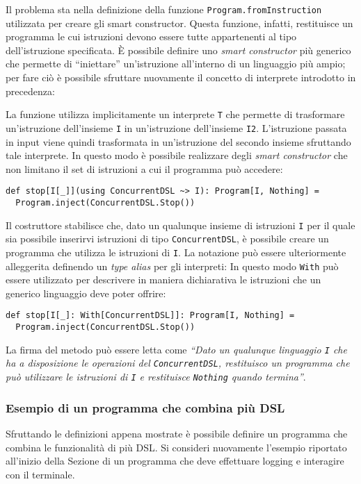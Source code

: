 Il problema sta nella definizione della funzione \lstinline{Program.fromInstruction} utilizzata per creare gli smart constructor. Questa funzione, infatti, restituisce un programma le cui istruzioni devono essere tutte appartenenti al tipo dell'istruzione specificata. È possibile definire uno \emph{smart constructor} più generico che permette di ``iniettare'' un'istruzione all'interno di un linguaggio più ampio; per fare ciò è possibile sfruttare nuovamente il concetto di interprete introdotto in precedenza:

La funzione utilizza implicitamente un interprete \lstinline{T} che permette di trasformare un'istruzione dell'insieme \lstinline{I} in un'istruzione dell'insieme \lstinline{I2}. L'istruzione passata in input viene quindi trasformata in un'istruzione del secondo insieme sfruttando tale interprete.
In questo modo è possibile realizzare degli \emph{smart constructor} che non limitano il set di istruzioni a cui il programma può accedere:
\begin{lstlisting}[language=scala3]
def stop[I[_]](using ConcurrentDSL ~> I): Program[I, Nothing] =
  Program.inject(ConcurrentDSL.Stop())
\end{lstlisting}
Il costruttore stabilisce che, dato un qualunque insieme di istruzioni \lstinline{I} per il quale sia possibile inserirvi istruzioni di tipo \lstinline{ConcurrentDSL}, è possibile creare un programma che utilizza le istruzioni di \lstinline{I}.
La notazione può essere ulteriormente alleggerita definendo un \emph{type alias} per gli interpreti:
In questo modo \lstinline{With} può essere utilizzato per descrivere in maniera dichiarativa le istruzioni che un generico linguaggio deve poter offrire:
\begin{lstlisting}[language=scala3]
def stop[I[_]: With[ConcurrentDSL]]: Program[I, Nothing] =
  Program.inject(ConcurrentDSL.Stop())
\end{lstlisting}
La firma del metodo può essere letta come \emph{``Dato un qualunque linguaggio \lstinline{I} che ha a disposizione le operazioni del \lstinline{ConcurrentDSL}, restituisco un programma che può utilizzare le istruzioni di \lstinline{I} e restituisce \lstinline{Nothing} quando termina''}.

\subsubsection{Esempio di un programma che combina più DSL}
Sfruttando le definizioni appena mostrate è possibile definire un programma che combina le funzionalità di più DSL. Si consideri nuovamente l'esempio riportato all'inizio della Sezione di un programma che deve effettuare logging e interagire con il terminale.


